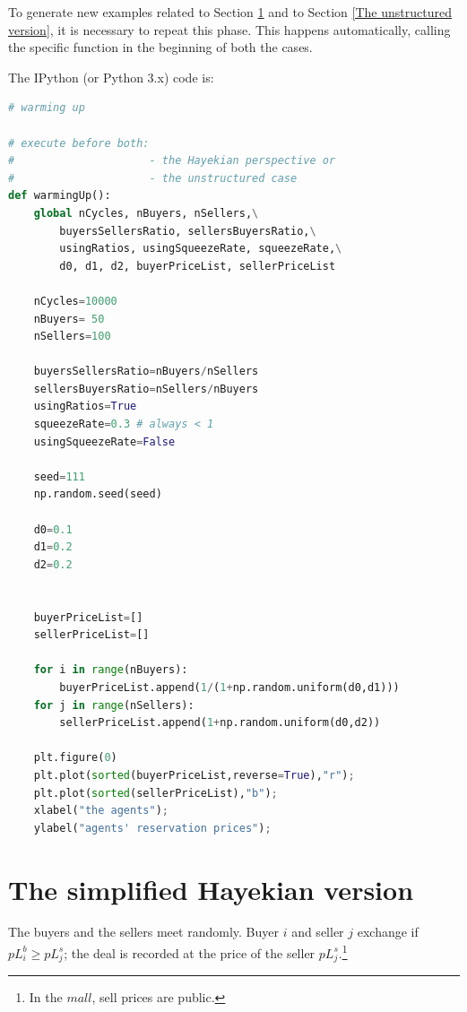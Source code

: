\documentclass[10pt]{report}
\begin{document}
To generate new examples related to Section \ref{The Hayekian version} and to Section \ref{The unstructured version}, it is necessary to repeat this phase. This happens automatically, calling the specific function in the beginning of both the cases.


The IPython (or Python 3.x) code is:


\begin{lstlisting}[language=Python, caption=Warming up of the model, 
label={Warming up of the model},basicstyle=\ttfamily\footnotesize]
# warming up

# execute before both: 
#                     - the Hayekian perspective or
#                     - the unstructured case
def warmingUp():
    global nCycles, nBuyers, nSellers,\
        buyersSellersRatio, sellersBuyersRatio,\
        usingRatios, usingSqueezeRate, squeezeRate,\
        d0, d1, d2, buyerPriceList, sellerPriceList

    nCycles=10000
    nBuyers= 50
    nSellers=100

    buyersSellersRatio=nBuyers/nSellers
    sellersBuyersRatio=nSellers/nBuyers
    usingRatios=True
    squeezeRate=0.3 # always < 1 
    usingSqueezeRate=False

    seed=111
    np.random.seed(seed)

    d0=0.1
    d1=0.2
    d2=0.2


    buyerPriceList=[]
    sellerPriceList=[]

    for i in range(nBuyers):
        buyerPriceList.append(1/(1+np.random.uniform(d0,d1)))
    for j in range(nSellers):
        sellerPriceList.append(1+np.random.uniform(d0,d2))
    
    plt.figure(0)
    plt.plot(sorted(buyerPriceList,reverse=True),"r");
    plt.plot(sorted(sellerPriceList),"b");
    xlabel("the agents");
    ylabel("agents' reservation prices");
\end{lstlisting}

\section{The simplified Hayekian version}\label{The Hayekian version}
 
The buyers and the sellers meet randomly. Buyer $i$ and seller $j$ exchange if  $pL^b_i \geq pL^s_j$; the deal is recorded at the price of the seller $pL^s_j$.\footnote{In the $mall$, sell prices are public.}
\end{document}
